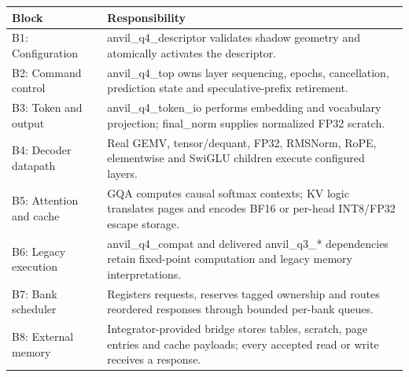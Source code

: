 \documentclass[11pt,a4paper]{article}
\begin{document}
{\small\renewcommand{\arraystretch}{1.18}\begin{longtable}{@{}L{0.24\textwidth}|L{0.7\textwidth}@{}}\toprule

\textbf{Block} & \textbf{Responsibility}\\\midrule\endhead

B1: Configuration & anvil\_\allowbreak{}q4\_\allowbreak{}descriptor validates shadow geometry and atomically activates the descriptor.\\[2pt]\hline

B2: Command control & anvil\_\allowbreak{}q4\_\allowbreak{}top owns layer sequencing,\allowbreak{} epochs,\allowbreak{} cancellation,\allowbreak{} prediction state and speculative-prefix retirement.\\[2pt]\hline

B3: Token and output & anvil\_\allowbreak{}q4\_\allowbreak{}token\_\allowbreak{}io performs embedding and vocabulary projection; final\_\allowbreak{}norm supplies normalized FP32 scratch.\\[2pt]\hline

B4: Decoder datapath & Real GEMV,\allowbreak{} tensor/\allowbreak{}dequant,\allowbreak{} FP32,\allowbreak{} RMSNorm,\allowbreak{} RoPE,\allowbreak{} elementwise and SwiGLU children execute configured layers.\\[2pt]\hline

B5: Attention and cache & GQA computes causal softmax contexts; KV logic translates pages and encodes BF16 or per-head INT8/\allowbreak{}FP32 escape storage.\\[2pt]\hline

B6: Legacy execution & anvil\_\allowbreak{}q4\_\allowbreak{}compat and delivered anvil\_\allowbreak{}q3\_\allowbreak{}*\allowbreak{} dependencies retain fixed-point computation and legacy memory interpretations.\\[2pt]\hline

B7: Bank scheduler & Registers requests,\allowbreak{} reserves tagged ownership and routes reordered responses through bounded per-bank queues.\\[2pt]\hline

B8: External memory & Integrator-provided bridge stores tables,\allowbreak{} scratch,\allowbreak{} page entries and cache payloads; every accepted read or write receives a response.\\[2pt]\hline

\bottomrule\end{longtable}}
\end{document}
